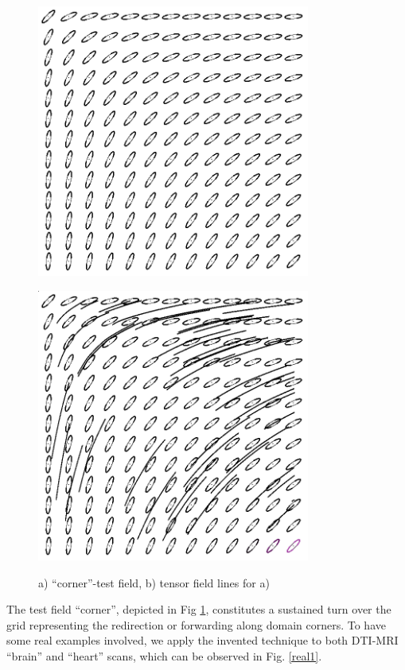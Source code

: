 \documentclass{scrartcl}
\begin{document}
\begin{figure}[!t]
\centering
  \begin{minipage}{0.4\textwidth}
    \includegraphics[width=0.8\textwidth]{img/corner.png}
    \label{a)}
  \end{minipage}
  \begin{minipage}{0.4\textwidth}
    \includegraphics[width=0.8\textwidth]{img/corner-TFL.png}
    \label{b)}
  \end{minipage}
\caption{a) ``corner''-test field, b) tensor field lines for a)}
\label{corner}
\end{figure}
The test field ``corner'', depicted in Fig \ref{corner}, constitutes a sustained turn over the grid representing the redirection or forwarding along domain corners. To have some real examples involved, we apply the invented technique to both DTI-MRI \enquote{brain} and \enquote{heart} scans, which can be observed in Fig. \ref{real1}.
\end{document}
